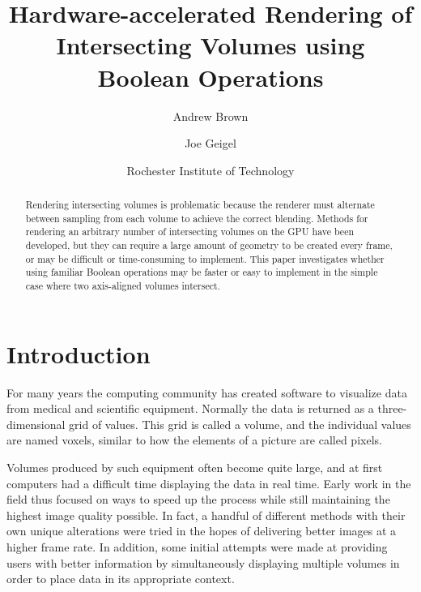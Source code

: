 \documentclass{article}
\begin{document}
\pagestyle{empty}

\title{Hardware-accelerated Rendering of Intersecting Volumes using Boolean Operations}
\author{Andrew Brown \and Joe Geigel}
\date{\small{Rochester Institute of Technology}}
\maketitle

\begin{abstract}
Rendering intersecting volumes is problematic because the renderer must
alternate between sampling from each volume to achieve the correct blending.
Methods for rendering an arbitrary number of intersecting volumes on the GPU
have been developed, but they can require a large amount of geometry to be
created every frame, or may be difficult or time-consuming to implement.  This
paper investigates whether using familiar Boolean operations may be faster or
easy to implement in the simple case where two axis-aligned volumes intersect.
\end{abstract}

\pagestyle{plain}

\section{Introduction}

For many years the computing community has created software to visualize data
from medical and scientific equipment.  Normally the data is returned as a
three-dimensional grid of values.  This grid is called a volume, and the
individual values are named voxels, similar to how the elements of a picture are
called pixels.

Volumes produced by such equipment often become quite large, and at first
computers had a difficult time displaying the data in real time.  Early work in
the field thus focused on ways to speed up the process while still maintaining
the highest image quality possible.  In fact, a handful of different methods
with their own unique alterations were tried in the hopes of delivering better
images at a higher frame rate.  In addition, some initial attempts were made at
providing users with better information by simultaneously displaying multiple
volumes in order to place data in its appropriate context.
\end{document}
